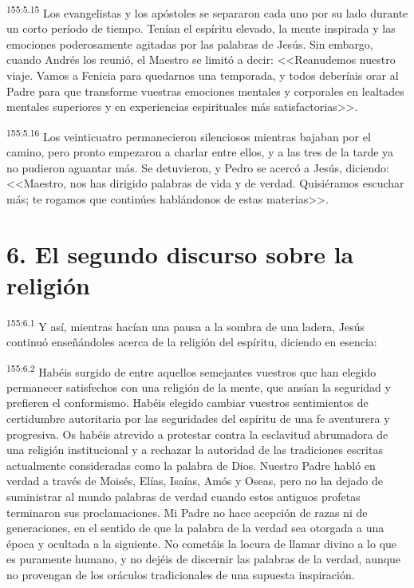 \par 
\textsuperscript{155:5.15} Los evangelistas y los apóstoles se separaron cada uno por su lado durante un corto período de tiempo. Tenían el espíritu elevado, la mente inspirada y las emociones poderosamente agitadas por las palabras de Jesús. Sin embargo, cuando Andrés los reunió, el Maestro se limitó a decir: <<Reanudemos nuestro viaje. Vamos a Fenicia para quedarnos una temporada, y todos deberíais orar al Padre para que transforme vuestras emociones mentales y corporales en lealtades mentales superiores y en experiencias espirituales más satisfactorias>>.

\par 
\textsuperscript{155:5.16} Los veinticuatro permanecieron silenciosos mientras bajaban por el camino, pero pronto empezaron a charlar entre ellos, y a las tres de la tarde ya no pudieron aguantar más. Se detuvieron, y Pedro se acercó a Jesús, diciendo: <<Maestro, nos has dirigido palabras de vida y de verdad. Quisiéramos escuchar más; te rogamos que continúes hablándonos de estas materias>>.

\section*{6. El segundo discurso sobre la religión}
\par 
\textsuperscript{155:6.1} Y así, mientras hacían una pausa a la sombra de una ladera, Jesús continuó enseñándoles acerca de la religión del espíritu, diciendo en esencia:

\par 
\textsuperscript{155:6.2} Habéis surgido de entre aquellos semejantes vuestros que han elegido permanecer satisfechos con una religión de la mente, que ansían la seguridad y prefieren el conformismo. Habéis elegido cambiar vuestros sentimientos de certidumbre autoritaria por las seguridades del espíritu de una fe aventurera y progresiva. Os habéis atrevido a protestar contra la esclavitud abrumadora de una religión institucional y a rechazar la autoridad de las tradiciones escritas actualmente consideradas como la palabra de Dios. Nuestro Padre habló en verdad a través de Moisés, Elías, Isaías, Amós y Oseas, pero no ha dejado de suministrar al mundo palabras de verdad cuando estos antiguos profetas terminaron sus proclamaciones. Mi Padre no hace acepción de razas ni de generaciones, en el sentido de que la palabra de la verdad sea otorgada a una época y ocultada a la siguiente. No cometáis la locura de llamar divino a lo que es puramente humano, y no dejéis de discernir las palabras de la verdad, aunque no provengan de los oráculos tradicionales de una supuesta inspiración.

